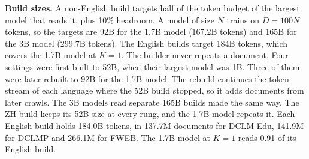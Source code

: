 \textbf{Build sizes.} A non-English build targets half of the token budget of the largest model that reads it, plus 10\% headroom. A model of size $N$ trains on $D = 100N$ tokens, so the targets are 92B for the 1.7B model (167.2B tokens) and 165B for the 3B model (299.7B tokens). The English builds target 184B tokens, which covers the 1.7B model at $K=1$. The builder never repeats a document. Four settings were first built to 52B, when their largest model was 1B. Three of them were later rebuilt to 92B for the 1.7B model. The rebuild continues the token stream of each language where the 52B build stopped, so it adds documents from later crawls. The 3B models read separate 165B builds made the same way. The ZH build keeps its 52B size at every rung, and the 1.7B model repeats it. Each English build holds 184.0B tokens, in 137.7M documents for DCLM-Edu, 141.9M for DCLMP and 266.1M for FWEB. The 1.7B model at $K=1$ reads 0.91 of its English build.

